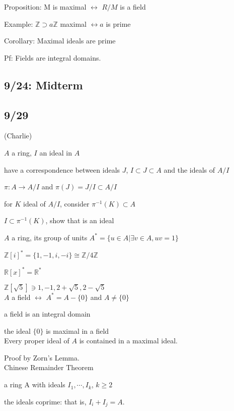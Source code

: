 \documentclass[12pt]{article}
\begin{document}
\noindent
Proposition: M is maximal $\leftrightarrow$ $R/M$ is a field

\noindent
Example: $\mathds{Z} \supset a\mathds{Z}$ maximal $\leftrightarrow a$ is prime

\noindent
Corollary: Maximal ideals are prime

Pf: Fields are integral domains.

\subsection{9/24: Midterm}

\subsection{9/29}

\noindent
(Charlie)

\noindent
$A$ a ring, $I$ an ideal in $A$

have a correspondence between ideals $J$, $I \subset J \subset A$ and the ideals of $A/I$

$\pi: A \to A/I$ and $\pi(J) = J/I \subset A/I$

for $K$ ideal of $A/I$, consider $\pi^{-1}(K) \subset A$

$I \subset \pi^{-1}(K)$, show that is an ideal

\noindent
$A$ a ring, its group of units $A^* = \{u \in A | \exists v \in A, uv = 1\}$

$\mathds{Z}[i]^* = \{1, -1, i, -i\} \cong \mathds{Z}/4\mathds{Z}$

$\mathds{R}[x]^* = \mathds{R}^*$

$\mathds{Z}[\sqrt{5}] \ni 1, -1, 2 + \sqrt{5}, 2 - \sqrt{5}$\\

\noindent
$A$ a field $\leftrightarrow$ $A^* = A - \{0\}$ and $A \neq \{0\}$

a field is an integral domain

the ideal $\{0\}$ is maximal in a field\\

\noindent
Every proper ideal of $A$ is contained in a maximal ideal.

Proof by Zorn's Lemma.\\

\noindent
Chinese Remainder Theorem

a ring A with ideals $I_1, \cdots, I_k$, $k \geq 2$

the ideals coprime: that is, $I_i + I_j = A$.
\end{document}
